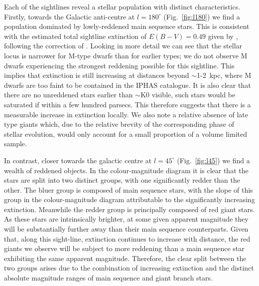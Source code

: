 \documentclass[useAMS,usenatbib]{mn2e}
\begin{document}
Each of the sightlines reveal a stellar population
with distinct characteristics.
Firstly, towards the Galactic anti-centre 
at $l=180^\circ$ (Fig.~\ref{fig:l180})
we find a population dominated by lowly-reddened main sequence stars.
This is consistent with the estimated total sightline extinction 
of $E(B-V)=0.49$ given by \cite{Schlegel1998},
following the correction of \cite{Schlafly2011}.
Looking in more detail we can see
that the stellar locus is narrower for M-type dwarfs
than for earlier types;
we do not observe M dwarfs experiencing 
the strongest reddening possible for this sightline.
This implies that extinction is still increasing 
at distances beyond $\sim$1-2~kpc,
where M dwarfs are too faint to be contained in the IPHAS catalogue.
It is also clear that there are no unreddened stars
earlier than $\sim$K0 visible,
such stars would be saturated if within a few hundred parsecs.
This therefore suggests 
that there is a measurable increase in extinction locally.
We also note a relative absence of late type giants which,
due to the relative brevity 
of the corresponding phase of stellar evolution,
would only account for a small proportion of a volume limited sample.
 
In contrast, 
closer towards the galactic centre
at $l=45^{\circ}$ (Fig.~\ref{fig:l45})
we find a wealth of reddened objects.
In the colour-magnitude diagram it is clear
that the stars are split into two distinct groups,
with one significantly redder than the other.
The bluer group is composed of main sequence stars,
with the slope of this group in the colour-magnitude diagram
attributable to the significantly increasing extinction.
Meanwhile the redder group is principally composed of red giant stars.
As these stars are intrinsically brighter,
at some given apparent magnitude they will be substantially further away
than their main sequence counterparts.
Given that, along this sight-line,
extinction continues to increase with distance,
the red giants we observe will be subject to more reddening
than a main sequence star exhibiting the same apparent magnitude.
Therefore, the clear split between the two groups arises
due to the combination of increasing extinction
and the distinct absolute magnitude ranges
of main sequence and giant branch stars.
\end{document}
